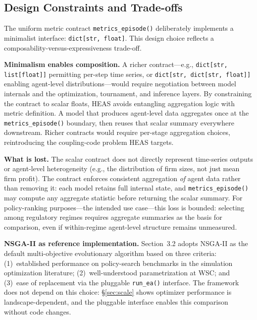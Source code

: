 \documentclass{wscpaperproc}
\begin{document}
\subsection{Design Constraints and Trade-offs}
\label{sec:design-constraints}

The uniform metric contract \texttt{metrics\_episode()} deliberately implements
a minimalist interface: \texttt{dict[str, float]}. This design choice reflects a
composability-versus-expressiveness trade-off.

\textbf{Minimalism enables composition.} A richer contract---e.g.,
\texttt{dict[str, list[float]]} permitting per-step time series, or
\texttt{dict[str, dict[str, float]]} enabling agent-level distributions---would
require negotiation between model internals and the optimization, tournament, and
inference layers. By constraining the contract to scalar floats, HEAS avoids
entangling aggregation logic with metric definition. A model that produces
agent-level data aggregates once at the \texttt{metrics\_episode()} boundary, then
reuses that scalar summary everywhere downstream. Richer contracts would require
per-stage aggregation choices, reintroducing the coupling-code problem HEAS targets.


\textbf{What is lost.} The scalar contract does not directly represent time-series
outputs or agent-level heterogeneity (e.g., the distribution of firm sizes, not
just mean firm profit). The contract enforces consistent aggregation \emph{of} agent data rather than removing it: each model retains full internal state, and \texttt{metrics\_episode()} may compute any aggregate statistic before returning the scalar summary. For policy-ranking purposes---the intended use case---this
loss is bounded: selecting among regulatory regimes requires aggregate summaries
as the basis for comparison, even if within-regime agent-level structure remains
unmeasured.

\textbf{NSGA-II as reference implementation.} Section~3.2 adopts NSGA-II as the
default multi-objective evolutionary algorithm based on three criteria:
(1)~established performance on policy-search benchmarks in the simulation
optimization literature; (2)~well-understood parametrization at WSC; and
(3)~ease of replacement via the pluggable \texttt{run\_ea()} interface. The
framework does not depend on this choice: \S\ref{sec:scale} shows optimizer performance is landscape-dependent, and the pluggable interface enables this comparison without code changes.

\end{document}
